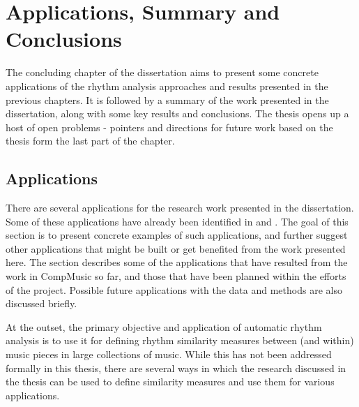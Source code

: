 \chapter{Applications, Summary and Conclusions}\label{chap:conclusions}
\begin{epigraphs}
\end{epigraphs}
The concluding chapter of the dissertation aims to present some concrete applications of the rhythm analysis approaches and results presented in the previous chapters. It is followed by a summary of the work presented in the dissertation, along with some key results and conclusions. The thesis opens up a host of open problems - pointers and directions for future work based on the thesis form the last part of the chapter. 
\section{Applications}
There are several applications for the research work presented in the dissertation. Some of these applications have already been identified in  and . The goal of this section is to present concrete examples of such applications, and further suggest other applications that might be built or get benefited from the work presented here. The section describes some of the applications that have resulted from the work in CompMusic so far, and those that have been planned within the efforts of the project. Possible future applications with the data and methods are also discussed briefly. 

At the outset, the primary objective and application of automatic rhythm analysis is to use it for defining rhythm similarity measures between (and within) music pieces in large collections of music. While this has not been addressed formally in this thesis, there are several ways in which the research discussed in the thesis can be used to define similarity measures and use them for various applications. 

